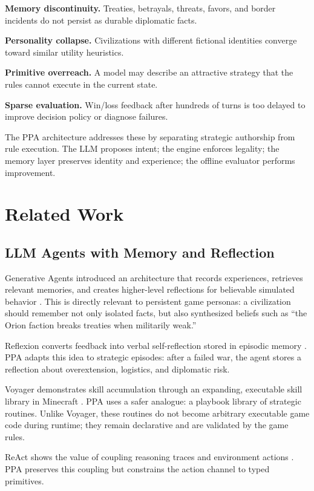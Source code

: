 \documentclass[10pt,twocolumn]{article}
\begin{document}
\textbf{Memory discontinuity.} Treaties, betrayals, threats, favors, and border incidents do not persist as durable diplomatic facts.

\textbf{Personality collapse.} Civilizations with different fictional identities converge toward similar utility heuristics.

\textbf{Primitive overreach.} A model may describe an attractive strategy that the rules cannot execute in the current state.

\textbf{Sparse evaluation.} Win/loss feedback after hundreds of turns is too delayed to improve decision policy or diagnose failures.

The PPA architecture addresses these by separating strategic authorship from rule execution. The LLM proposes intent; the engine enforces legality; the memory layer preserves identity and experience; the offline evaluator performs improvement.

\section{Related Work}
\subsection{LLM Agents with Memory and Reflection}
Generative Agents introduced an architecture that records experiences, retrieves relevant memories, and creates higher-level reflections for believable simulated behavior \cite{park2023generative}. This is directly relevant to persistent game personas: a civilization should remember not only isolated facts, but also synthesized beliefs such as ``the Orion faction breaks treaties when militarily weak.''

Reflexion converts feedback into verbal self-reflection stored in episodic memory \cite{shinn2023reflexion}. PPA adapts this idea to strategic episodes: after a failed war, the agent stores a reflection about overextension, logistics, and diplomatic risk.

Voyager demonstrates skill accumulation through an expanding, executable skill library in Minecraft \cite{wang2023voyager}. PPA uses a safer analogue: a playbook library of strategic routines. Unlike Voyager, these routines do not become arbitrary executable game code during runtime; they remain declarative and are validated by the game rules.

ReAct shows the value of coupling reasoning traces and environment actions \cite{yao2023react}. PPA preserves this coupling but constrains the action channel to typed primitives.
\end{document}
